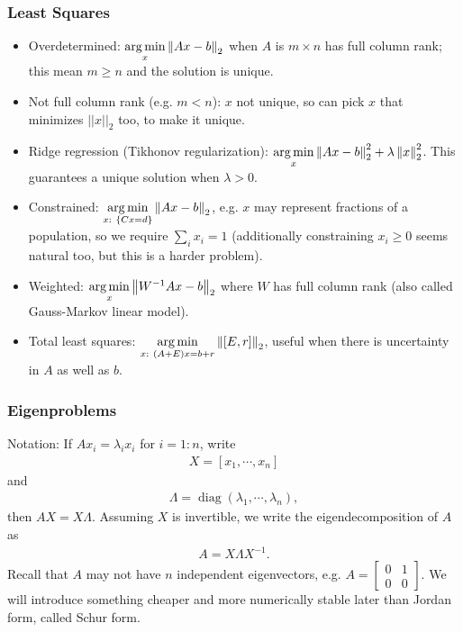 \documentclass[11pt]{article}
\numberwithin{equation}{section}
\begin{document}
\subsubsection{Least Squares}
\begin{itemize}
    \item Overdetermined: $\underset{x}{\arg \min}\left\| Ax-b \right\|_2$ when $A$ is $m \times n$ has full column rank; this mean $m \geq n$ and the solution is unique.
    \item Not full column rank (e.g. $m < n$): $x$ not unique, so can pick $x$ that minimizes $|| x ||_2$ too, to make it unique.
    \item Ridge regression (Tikhonov regularization): $\underset{x}{\arg \min}\left\| Ax-b \right\|_2^2 + \lambda \left\| x \right\|_2^2$. This guarantees a unique solution when $\lambda > 0$.
    \item Constrained: $\underset{x:\ \left\{ Cx=d \right\}}{\arg \min}\left\| Ax-b \right\|_2$, e.g. $x$ may represent fractions of a population, so we require $\sum_i x_i = 1$
    (additionally constraining $x_i \geq 0$ seems natural too, but this is a harder problem).
    \item Weighted: $\underset{x}{\arg \min}\left\| W^{-1} Ax-b \right\|_2$ where $W$ has full column rank (also called Gauss-Markov linear model).
    \item Total least squares: $\underset{x: \ (A+E)x=b+r}{\arg \min}\norm{[E,r]}_2$, useful when there is uncertainty in $A$ as well as $b$.
\end{itemize}

\subsubsection{Eigenproblems}
Notation: If $A x_{i}=\lambda_{i} x_{i}$ for $i=1:n$, write \begin{align*}
    X=[x_1, \cdots, x_n]
\end{align*}
and \begin{align*}
    \Lambda = \operatorname{diag}(\lambda_1, \cdots, \lambda_n),
\end{align*}
then $AX = X\Lambda$. Assuming $X$ is invertible, we write the eigendecomposition of $A$ as \begin{align*}
    A = X\Lambda X^{-1}.
\end{align*}
Recall that $A$ may not have $n$ independent eigenvectors, e.g. $A=\left[\begin{array}{ll}
    0 & 1 \\
    0 & 0
    \end{array}\right]$. We will introduce something cheaper and more numerically stable later than Jordan form, called Schur form.
\end{document}
